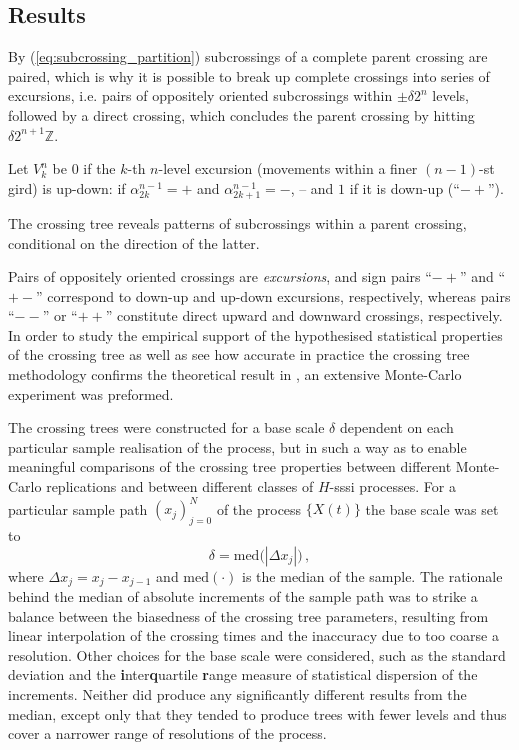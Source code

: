 \documentclass[a4paper]{article}
\begin{document}

\subsection{Results} %
\label{sub:results}


By (\ref{eq:subcrossing_partition}) subcrossings of a complete parent crossing are
paired, which is why it is possible to break up complete crossings into series of
excursions, i.e. pairs of oppositely oriented subcrossings within $\pm\delta 2^n$
levels, followed by a direct crossing, which concludes the parent crossing by hitting
$\delta 2^{n+1} \mathbb{Z}$.

Let $V_k^n$ be $0$ if the $k$-th $n$-level excursion (movements within a finer $(n-1)$-st
gird) is up-down: if $\alpha_{2k}^{n-1} = +$ and $\alpha_{2k+1}^{n-1} = -$, --
and $1$ if it is down-up (``$-+$'').

The crossing tree reveals patterns of subcrossings within a parent crossing,
conditional on the direction of the latter.

Pairs of oppositely oriented crossings are
\emph{excursions}, and sign pairs ``$-+$'' and ``$+-$'' correspond to down-up
and up-down excursions, respectively, whereas pairs ``$--$'' or ``$++$'' constitute
direct upward and downward crossings, respectively.
In order to study the empirical support of the hypothesised statistical properties of
the crossing tree as well as see how accurate in practice the crossing tree methodology
confirms the theoretical result in \cite{ECP1673}, an extensive Monte-Carlo experiment
was preformed.

The crossing trees were constructed for a base scale $\delta$ dependent on each particular
sample realisation of the process, but in such a way as to enable meaningful comparisons
of the crossing tree properties between different Monte-Carlo replications and between
different classes of $H$-sssi processes. For a particular sample path $(x_j)_{j=0}^N$
of the process $\{X(t)\}$ the base scale was set to
\[ \delta = \text{med}\bigl( |\Delta x_j| \bigr) \,, \]
where $\Delta x_j = x_j - x_{j-1}$ and $\text{med}(\cdot)$ is the median of the
sample. The rationale behind the median of absolute increments of the sample path
was to strike a balance between the biasedness of the crossing tree parameters,
resulting from linear interpolation of the crossing times and the inaccuracy due to
too coarse a resolution. Other choices for the base scale were considered, such
as the standard deviation and the \textbf{i}nter\textbf{q}uartile \textbf{r}ange
measure of statistical dispersion of the increments. Neither did produce any significantly
different results from the median, except only that they tended to produce trees with
fewer levels and thus cover a narrower range of resolutions of the process.
\end{document}
